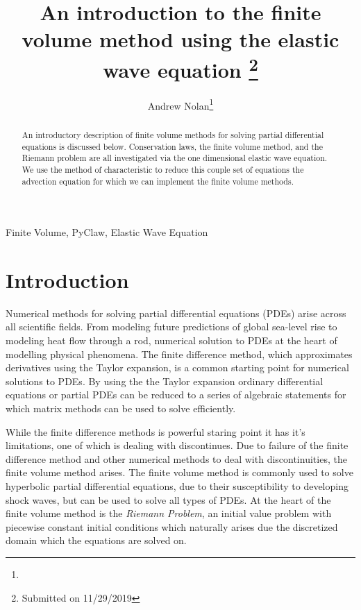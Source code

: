 \documentclass[review,onefignum,onetabnum]{siamart171218}
\title{An introduction to the finite volume method using the elastic wave equation 
\thanks{Submitted on 11/29/2019}}
\author{Andrew Nolan\thanks{\email{anolan@sfu.ca}}}
\begin{document}
\maketitle

\begin{abstract}
    An introductory description of finite volume methods for solving partial differential equations is discussed below. Conservation laws, the finite volume method, and the Riemann problem are all investigated via the one dimensional elastic wave equation. We use the method of characteristic to reduce this couple set of equations the advection equation for which we can implement the finite volume methods.
\end{abstract}

\begin{keywords}
  Finite Volume, PyClaw, Elastic Wave Equation
\end{keywords}


\section{Introduction} 
Numerical methods for solving partial differential equations (PDEs) arise across all scientific fields. From modeling future predictions of global sea-level rise to modeling heat flow through a rod, numerical solution to PDEs at the heart of modelling physical phenomena. The finite difference method, which approximates derivatives using the Taylor expansion, is a common starting point for numerical solutions to PDEs. By using the the Taylor expansion ordinary differential equations or partial PDEs can be reduced to a series of algebraic statements for which matrix methods can be used to solve efficiently.  

While the finite difference methods is powerful staring point it has it's limitations, one of which is dealing with discontinues. Due to failure of the finite difference method and other numerical methods to deal with discontinuities, the finite volume method arises. The finite volume method is commonly used to solve hyperbolic partial differential equations, due to their susceptibility to developing shock waves, but can be used to solve all types of PDEs. At the heart of the finite volume method is the \textit{Riemann Problem}, an initial value problem with piecewise constant initial conditions which naturally arises due the discretized domain which the equations are solved on. 
\end{document}
